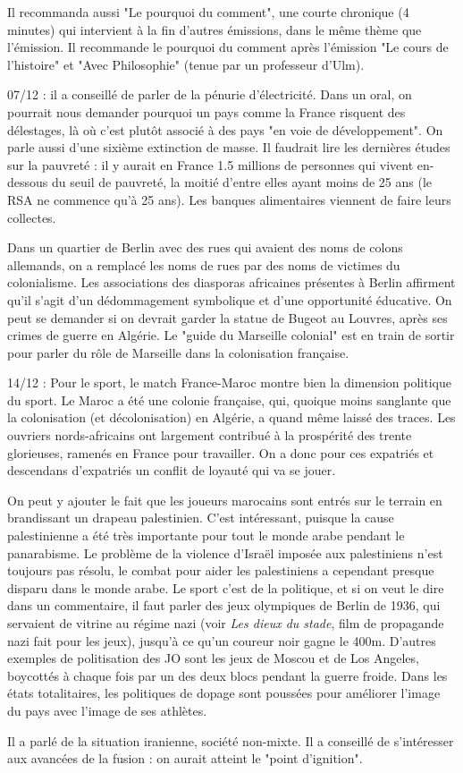 \documentclass[a4paper,12pt]{book}
\begin{document}
\par Il recommanda aussi "Le pourquoi du comment", une courte chronique (4 minutes) qui intervient à la fin d'autres émissions, dans le même thème que l'émission. Il recommande le pourquoi du comment après l'émission "Le cours de l'histoire" et "Avec Philosophie" (tenue par un professeur d'Ulm).
\par 07/12 : il a conseillé de parler de la pénurie d'électricité. Dans un oral, on pourrait nous demander pourquoi un pays comme la France risquent des délestages, là où c'est plutôt associé à des pays "en voie de développement". On parle aussi d'une sixième extinction de masse. Il faudrait lire les dernières études sur la pauvreté : il y aurait en France 1.5 millions de personnes qui vivent en-dessous du seuil de pauvreté, la moitié d'entre elles ayant moins de 25 ans (le RSA ne commence qu'à 25 ans). Les banques alimentaires viennent de faire leurs collectes.
\par Dans un quartier de Berlin avec des rues qui avaient des noms de colons allemands, on a remplacé les noms de rues par des noms de victimes du colonialisme. Les associations des diasporas africaines présentes à Berlin affirment qu'il s'agit d'un dédommagement symbolique et d'une opportunité éducative. On peut se demander si on devrait garder la statue de Bugeot au Louvres, après ses crimes de guerre en Algérie. Le "guide du Marseille colonial" est en train de sortir pour parler du rôle de Marseille dans la colonisation française.
\par 14/12 : Pour le sport, le match France-Maroc montre bien la dimension politique du sport. Le Maroc a été une colonie française, qui, quoique moins sanglante que la colonisation (et décolonisation) en Algérie, a quand même laissé des traces. Les ouvriers nords-africains ont largement contribué à la prospérité des trente glorieuses, ramenés en France pour travailler. On a donc pour ces expatriés et descendans d'expatriés un conflit de loyauté qui va se jouer.
\par On peut y ajouter le fait que les joueurs marocains sont entrés sur le terrain en brandissant un drapeau palestinien. C'est intéressant, puisque la cause palestinienne a été très importante pour tout le monde arabe pendant le panarabisme. Le problème de la violence d'Israël imposée aux palestiniens n'est toujours pas résolu, le combat pour aider les palestiniens a cependant presque disparu dans le monde arabe. Le sport c'est de la politique, et si on veut le dire dans un commentaire, il faut parler des jeux olympiques de Berlin de 1936, qui servaient de vitrine au régime nazi (voir \textit{Les dieux du stade}, film de propagande nazi fait pour les jeux), jusqu'à ce qu'un coureur noir gagne le 400m. D'autres exemples de politisation des JO sont les jeux de Moscou et de Los Angeles, boycottés à chaque fois par un des deux blocs pendant la guerre froide. Dans les états totalitaires, les politiques de dopage sont poussées pour améliorer l'image du pays avec l'image de ses athlètes.
\par Il a parlé de la situation iranienne, société non-mixte. Il a conseillé de s'intéresser aux avancées de la fusion : on aurait atteint le "point d'ignition".
\end{document}
